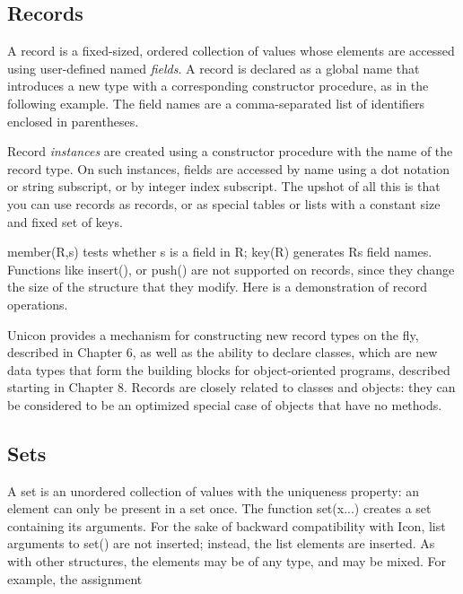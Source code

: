 \subsection{Records}
A record is a fixed-sized, ordered collection of values
whose elements are accessed using user-defined named \textit{fields}. A
record is declared as a global name that introduces a new type with a
corresponding constructor procedure, as in
the following example. The field names are a comma-separated list of
identifiers enclosed in parentheses.


Record \textit{instances} are created using a
constructor procedure with the name of the record type. On such
instances, fields are accessed by name using a dot notation or string
subscript, or by integer index subscript. The upshot of all this is
that you can use records as records, or as special tables or lists with
a constant size and fixed set of keys.

\textsf{member(R,s)} tests whether \textsf{s} is a field in \textsf{R};
\textsf{key(R)} generates \textsf{R}{\textquotesingle}s field names.
Functions like \textsf{insert()}, or \textsf{push()} are not supported
on records, since they change the size of the structure that they
modify. Here is a demonstration of record operations.


Unicon provides a mechanism for constructing new record types on the
fly, described in Chapter 6, as well as the ability to declare classes,
which are new data types that form the building blocks for
object-oriented programs, described starting in Chapter 8. Records are
closely related to classes and objects: they can be considered to be an
optimized special case of objects that have no methods. \ 

\subsection{Sets}

A set is an unordered collection of values with the
uniqueness property: an element can only be present in a set once. The
function \textsf{set(x...)} creates a set containing its arguments. For
the sake of backward compatibility with Icon, list arguments to
\textsf{set()} are not inserted; instead, the list elements are
inserted. As with other structures, the elements may be of any type,
and may be mixed. For example, the assignment

